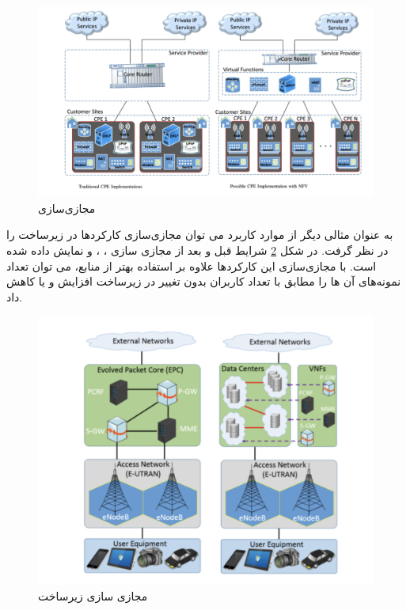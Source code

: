 \begin{figure}[h!]
\center\includegraphics[scale=.5]{images/cpe}
\caption{مجازی‌سازی }
\label{fig.20}
\end{figure}

به عنوان مثالی دیگر از موارد کاربرد می توان مجازی‌سازی کارکردها در زیرساخت  را در نظر گرفت.
در شکل \ref{fig.21} شرایط قبل و بعد از مجازی سازی
، ،  و 
نمایش داده شده است.
با مجازی‌سازی این کارکردها علاوه بر استفاده بهتر از منابع، می توان تعداد نمونه‌های آن ها را مطابق با تعداد کاربران بدون تغییر در زیرساخت افزایش و یا کاهش داد.

\begin{figure}[h!]
\center\includegraphics[scale=.5]{images/lte}
\caption{مجازی سازی زیرساخت }
\label{fig.21}
\end{figure}

